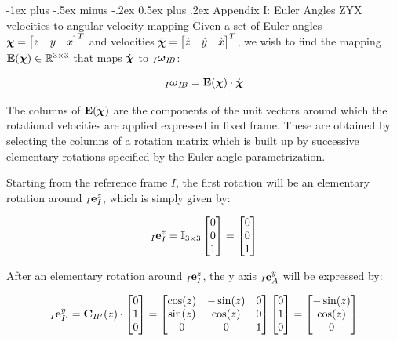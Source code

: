 \documentclass[10pt,landscape,a4paper]{article}
\makeatletter
\renewcommand{\section}{\@startsection{section}{1}{0mm}%
                               {-1ex plus -.5ex minus -.2ex}%
                                {0.5ex plus .2ex}%
                                {\normalfont\large\bfseries}}
\newcommand\comat[2]{\vC_{#1\!#2}}
\newcommand\rotvel[3]{{}_#1\vom_{#2\!#3}}
\newcommand\dvch[0]{\dot{\vch}}
\makeatother
\begin{document}
\begin{multicols}{2}
\section{Appendix I: Euler Angles ZYX velocities to angular velocity mapping}
Given a set of Euler angles $\mbox{\boldmath $\chi$} = \begin{bmatrix}z & y & x\end{bmatrix}^T$ and velocities $\dvch = \begin{bmatrix} \dot{z} & \dot{y} & \dot{x} \end{bmatrix}^T$,
we wish to find the mapping $\mathbf E(\mbox{\boldmath $\chi$}) \in \mathbb{R}^{3 \times 3}$ that maps $\dvch$ to $\rotvel{I}{I}{B}$:

\begin{equation}
\rotvel{I}{I}{B} = \vE(\vch) \cdot \dvch
\end{equation}

The columns of $\mathbf E(\mbox{\boldmath $\chi$})$ are the components of the unit vectors around which the rotational velocities are applied expressed in fixed frame. These are obtained by selecting the columns of a rotation matrix which is built up by successive elementary rotations specified by the Euler angle parametrization.

Starting from the reference frame $I$, the first rotation will be an elementary rotation around ${}_I \mathbf e^z_I$, which is simply given by:

\begin{equation}
{}_I \mathbf e^z_I = 
\mathbb{I}_{3 \times 3}
\begin{bmatrix}
0 \\ 0 \\ 1
\end{bmatrix}
=
\begin{bmatrix}
0 \\ 0 \\ 1
\end{bmatrix}
\end{equation}

After an elementary rotation around ${}_I \mathbf e^z_I$, the y axis ${}_I \mathbf e^y_A$ will be expressed by:

\begin{equation}
{}_I \ve^y_{I'} = 
\comat{I}{I'}(z) 
\cdot
\begin{bmatrix}
0 \\ 1 \\ 0
\end{bmatrix}
=
\begin{bmatrix}
\cos(z) & -\sin(z) & 0 \\ 
\sin(z) &  \cos(z) & 0 \\ 
0 & 0 & 1
\end{bmatrix}
\begin{bmatrix}
0 \\ 1 \\ 0
\end{bmatrix}
=
\begin{bmatrix}
-\sin(z) \\ \cos(z) \\ 0
\end{bmatrix}
\end{equation}


\end{multicols}
\end{document}
